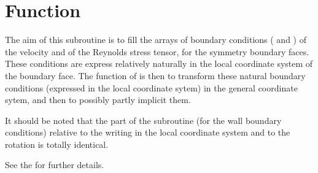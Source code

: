 
%
%
%
%



\hypertarget{clsyvt}{}

\vspace{1cm}
\section*{Function}

The aim of this subroutine is to fill the arrays of boundary conditions
 ( and ) of the velocity and of the Reynolds stress tensor,
for the symmetry boundary faces.
These conditions are express relatively naturally in the local coordinate system
of the boundary face. The function of  is then to transform these
natural boundary conditions (expressed in the local coordinate sytem) in the
general coordinate sytem, and then to possibly partly implicit them.

It should be noted that the part of the subroutine   (for the wall
boundary conditions) relative to the writing in the local coordinate system and to
the rotation is totally identical.

See the 
for further details.

